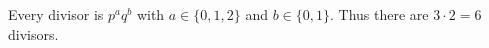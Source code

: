 Every divisor is $p^a q^b$ with $a\in\{0,1,2\}$ and $b\in\{0,1\}$. Thus there are $3\cdot2=\boxed6$ divisors.
